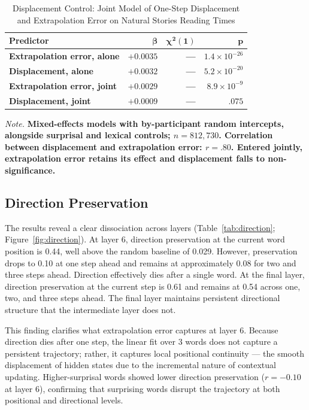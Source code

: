 \documentclass[12pt]{article}
\newcommand{\new}[1]{{\bfseries #1}}
\begin{document}
\begin{table}[!htbp]
\centering
\caption{Displacement Control: Joint Model of One-Step Displacement and Extrapolation Error on Natural Stories Reading Times}
\label{tab:displacement}
\begin{tabular}{lrrr}
\toprule
\textbf{Predictor} & $\boldsymbol{\beta}$ & $\boldsymbol{\chi^2(1)}$ & $\boldsymbol{p}$ \\
\midrule
\new{Extrapolation error, alone} & \new{$+0.0035$} & \new{---} & \new{$1.4 \times 10^{-26}$} \\
\new{Displacement, alone} & \new{$+0.0032$} & \new{---} & \new{$5.2 \times 10^{-20}$} \\
\new{Extrapolation error, joint} & \new{$+0.0029$} & \new{---} & \new{$8.9 \times 10^{-9}$} \\
\new{Displacement, joint} & \new{$+0.0009$} & \new{---} & \new{$.075$} \\
\bottomrule
\end{tabular}

\smallskip
\footnotesize
\textit{Note.} \new{Mixed-effects models with by-participant random intercepts, alongside surprisal and lexical controls; $n = 812{,}730$. Correlation between displacement and extrapolation error: $r = .80$. Entered jointly, extrapolation error retains its effect and displacement falls to non-significance.}
\end{table}

\subsection{Direction Preservation}

The results reveal a clear dissociation across layers (Table~\ref{tab:direction}; Figure~\ref{fig:direction}). At layer 6, direction preservation at the current word position is 0.44, well above the random baseline of 0.029. However, preservation drops to 0.10 at one step ahead and remains at approximately 0.08 for two and three steps ahead. Direction effectively dies after a single word. At the final layer, direction preservation at the current step is 0.61 and remains at 0.54 across one, two, and three steps ahead. The final layer maintains persistent directional structure that the intermediate layer does not.

This finding clarifies what extrapolation error captures at layer 6. Because direction dies after one step, the linear fit over 3 words does not capture a persistent trajectory; rather, it captures local positional continuity --- the smooth displacement of hidden states due to the incremental nature of contextual updating. Higher-surprisal words showed lower direction preservation ($r = -0.10$ at layer 6), confirming that surprising words disrupt the trajectory at both positional and directional levels.
\end{document}
